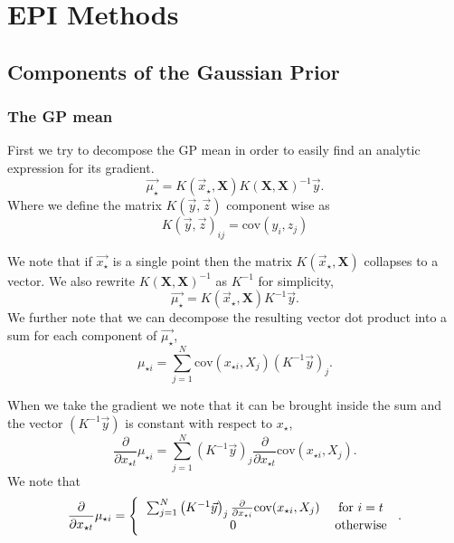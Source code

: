 \documentclass[phd,tocprelim]{cornell}
\begin{document}

\chapter{EPI Methods} %
\label{cha:EPI Methods}

\section{Components of the Gaussian Prior}

\subsection{The GP mean}

First we try to decompose the GP mean in order to easily find an analytic expression for its gradient.
\begin{equation}
 \vec{\mu_{\star}} = K(\vec{x}_{\star}, \textbf{X} )K(\textbf{X},\textbf{X})^{-1}\vec{y}.
\end{equation}
Where we define the matrix $K(\vec{y}, \vec{z})$ component wise as
\begin{equation}
 K(\vec{y}, \vec{z})_{ij} = \mbox{cov}(y_{i}, z_{j})
\end{equation}

We note that if $\vec{x_{\star}}$ is a single point then the matrix $K(\vec{x}_{\star}, \textbf{X} )$ collapses to a vector. We also rewrite $K(\textbf{X},\textbf{X})^{-1}$ as $K^{-1}$ for simplicity,
\begin{equation}
 \vec{\mu_{\star}} = K(\vec{x}_{\star}, \textbf{X} ) K^{-1} \vec{y}.
\end{equation}
We further note that we can decompose the resulting vector dot product into a sum for each component of $\vec{\mu_{\star}}$,
\begin{equation}
 \mu_{\star {i}} = \sum_{j = 1}^{N} \mbox{cov}(x_{\star i}, X_{j}) \left(K^{-1} \vec{y} \right)_{j}.
\end{equation}

When we take the gradient we note that it can be brought inside the sum and the vector $(K^{-1}\vec{y})$ is constant with respect to $x_{\star}$,
\begin{equation}
 \frac{\partial}{\partial x_{\star t}} \mu_{\star i} = \sum_{j = 1}^{N} \left(K^{-1} \vec{y} \right)_{j} \frac{\partial}{\partial x_{\star t}} \mbox{cov}(x_{\star i}, X_{j}).
\end{equation}
We note that
\begin{equation}
\frac{\partial}{\partial x_{\star t}} \mu_{\star i} = \left\{ \begin{tabular}{cc}
                                                                  $\sum_{j = 1}^{N} \left(K^{-1} \vec{y} \right)_{j} \frac{\partial}{\partial x_{\star i}} \mbox{cov}(x_{\star i}, X_{j})$ & for $i = t$ \\
								  0 & otherwise
                                                                 \end{tabular}\right..
\end{equation}
\end{document}
